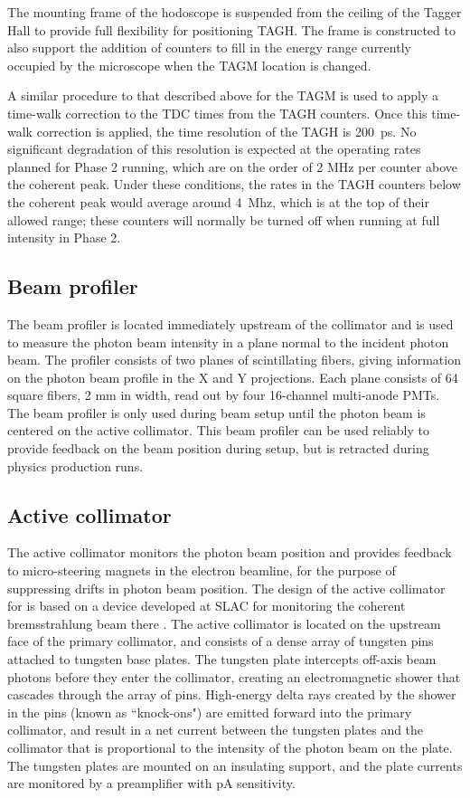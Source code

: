 The mounting frame of the hodoscope is suspended from the ceiling of the Tagger Hall
to provide full flexibility for positioning TAGH. The frame is constructed
to also support the addition of counters to fill in the energy range currently
occupied by the microscope when the TAGM location is changed.

A similar procedure to that described above for the TAGM is used to apply
a time-walk correction to the TDC times from the TAGH counters. Once this
time-walk correction
is applied, the time resolution of the TAGH is 200~ps. No significant
degradation of this resolution is expected at the operating rates planned
for Phase 2 running, which are on the order of 2 MHz per counter above
the coherent peak. Under these conditions, the rates in the TAGH counters
below the coherent peak would average around 4~Mhz, which is at the top
of their allowed range; these counters will normally be turned off when
running at full intensity in Phase 2.

\subsection{Beam profiler}
The beam profiler is located immediately upstream of the collimator and is
used to measure the photon beam intensity in a plane normal to the incident
photon beam. The profiler consists of two planes
of scintillating fibers, giving information on the photon beam profile
in the X and Y projections. Each plane consists of 64 square fibers,
2 mm in width, read out by four 16-channel multi-anode PMTs. The beam profiler
is only used during beam setup until the photon beam is centered on the active collimator.
This beam profiler can be used reliably to provide feedback on
the beam position during setup, but is retracted during physics production runs.

\subsection{Active collimator \label{sec:coll}}
The active collimator monitors the photon beam position and provides
feedback to micro-steering magnets in the electron beamline, for the
purpose of suppressing drifts in photon beam position. 
The
design of the active collimator for \GX{} is based on a device 
developed at SLAC for monitoring
the coherent bremsstrahlung beam there \cite{Miller:1973yi}.
The \GX{} active collimator is located on
the upstream face of the primary collimator, and consists of a dense
array of tungsten pins attached to tungsten base plates. The tungsten
plate intercepts off-axis beam photons before they enter the collimator,
creating an electromagnetic shower that cascades through the array
of pins. High-energy delta rays created by the
shower in the pins (known as ``knock-ons") 
are emitted forward into the primary collimator, and
result in a net current between the tungsten plates and the collimator
that is proportional to the intensity of the photon beam on the plate.
The tungsten plates are mounted on an insulating support, and the plate
currents are monitored by a preamplifier with pA sensitivity. 

